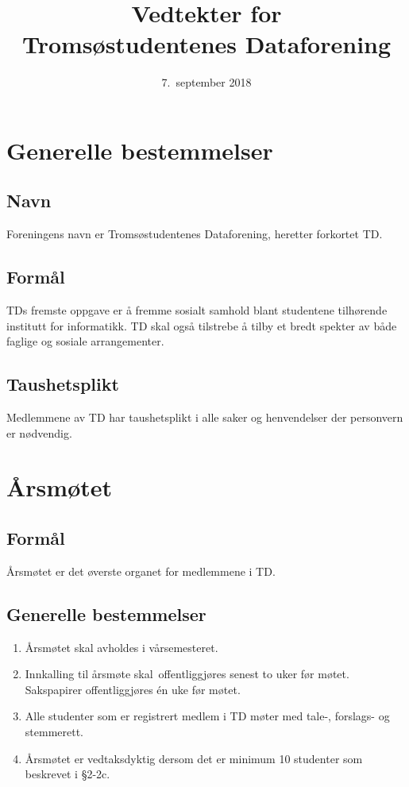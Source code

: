 \documentclass[11pt]{article}
\title{\Huge{Vedtekter for\\Tromsøstudentenes Dataforening}}
\date{7.\ september 2018}
\author{}
\begin{document}
\maketitle
\section{Generelle bestemmelser}
\subsection{Navn}
Foreningens navn er Tromsøstudentenes Dataforening, heretter forkortet TD.

\subsection{Formål}
TDs fremste oppgave er å fremme sosialt samhold blant studentene tilhørende institutt for informatikk.
TD skal også tilstrebe å tilby et bredt spekter av både faglige og sosiale arrangementer. 

\subsection{Taushetsplikt}
Medlemmene av TD har taushetsplikt i alle saker og henvendelser der personvern er nødvendig. 

\section{Årsmøtet}
\subsection{Formål}
Årsmøtet er det øverste organet for medlemmene i TD.

\subsection{Generelle bestemmelser}
\begin{enumerate}
	\item Årsmøtet skal avholdes i vårsemesteret.
	\item Innkalling til årsmøte skal offentliggjøres senest to uker før møtet. Sakspapirer offentliggjøres én uke før møtet. 
	\item Alle studenter som er registrert medlem i TD møter med tale-, forslags- og stemmerett. 
	\item Årsmøtet er vedtaksdyktig dersom det er minimum 10 studenter som beskrevet i §2-2c.
\end{enumerate}
\end{document}
